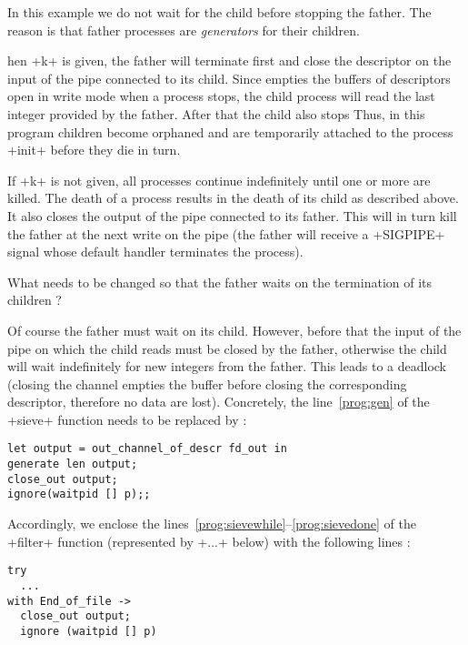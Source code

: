 In this example we do not wait for the child before stopping the
father. The reason is that father processes are \emph{generators} for
their children.

hen \ml+k+ is given, the father will terminate first and close
the descriptor on the input of the pipe connected to its child. Since
{\ocaml} empties the buffers of descriptors open in write mode when a
process stops, the child process will read the last integer provided
by the father. After that the child also stops {\etc} Thus, in this
program children become orphaned and are temporarily attached to the
process \ml+init+ before they die in turn.

If \ml+k+ is not given, all processes continue indefinitely until one or
more are killed. The death of a process results in the death of its child
as described above. It also closes the output of the pipe connected to
its father. This will in turn kill the father at the next write on the
pipe (the father will receive a \ml+SIGPIPE+ signal whose default
handler terminates the process).

\begin{exercise}
What needs to be changed so that the father waits on the termination
of its children ? 
\end{exercise}
\begin{answer}
Of course the father must wait on its child. However, before that the
input of the pipe on which the child reads must be closed by the
father, otherwise the child will wait indefinitely for new integers from the
father. This leads to a deadlock (closing the channel empties the
buffer before closing the corresponding descriptor, therefore no data
are lost).  Concretely, the line~\ref{prog:gen} of the \ml+sieve+
function needs to be replaced by :
\begin{lstlisting}
let output = out_channel_of_descr fd_out in
generate len output;
close_out output;
ignore(waitpid [] p);;
\end{lstlisting}
Accordingly, we enclose the 
lines~\ref{prog:sievewhile}--\ref{prog:sievedone} of the 
\ml+filter+ function (represented by \ml+...+ below) with the
following lines :
\begin{lstlisting}
try 
  ...
with End_of_file -> 
  close_out output;
  ignore (waitpid [] p)
\end{lstlisting}
\end{answer}

